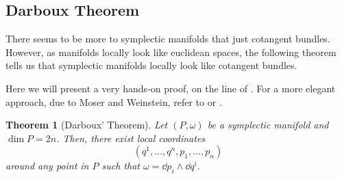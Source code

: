 \documentclass[english,fontsize=11pt,paper=b5]{scrbook}
\newtheorem{theorem}{Theorem}[chapter]
\theoremstyle{definition}
\begin{document}
    \subsection{Darboux Theorem}

    There seems to be more to symplectic manifolds that just cotangent bundles.
    However, as manifolds locally look like euclidean spaces, the following theorem tells us that symplectic manifolds locally look like cotangent bundles.

    Here we will present a very hands-on proof, on the line of \cite[Problem 22-19]{book:lee}. For a more elegant approach, due to Moser and Weinstein, refer to \cite[Chapter 22]{book:lee} or \cite[Chapter 10.3]{book:knauf}.

    \begin{theorem}[Darboux' Theorem]
      Let $(P, \omega)$ be a symplectic manifold and $\dim P = 2n$.
      Then, there exist local coordinates
      \begin{equation}
        (q^1, \ldots, q^n, p_1, \ldots, p_n)
      \end{equation} around any point in $P$ such that $\omega = \dd p_i \wedge \dd q^i$.
    \end{theorem}
\end{document}
